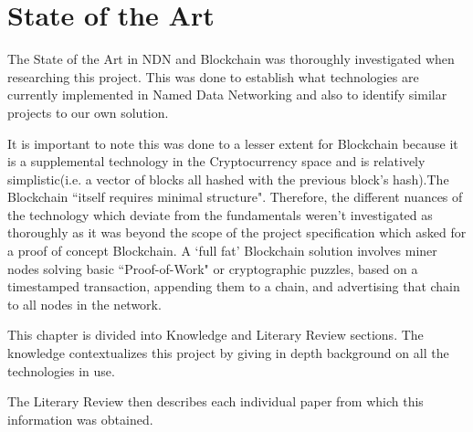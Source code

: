 \chapter{State of the Art}
The State of the Art in NDN and Blockchain was thoroughly investigated when researching this project. This was done to establish what technologies are currently implemented in Named Data Networking and also to identify similar projects to our own solution.\par It is important to note this was done to a lesser extent for Blockchain because it is a supplemental technology in the Cryptocurrency space and is relatively simplistic(i.e. a vector of blocks all hashed with the previous block's hash).The Blockchain ``itself requires minimal structure"\cite{08}. Therefore, the different nuances of the technology which deviate from the fundamentals weren't investigated as thoroughly as it was beyond the scope of the project specification which asked for a proof of concept Blockchain. A `full fat' Blockchain solution involves miner nodes solving basic ``Proof-of-Work" or cryptographic puzzles\cite{09}, based on a timestamped transaction, appending them to a chain, and advertising that chain to all nodes in the network. 

This chapter is divided into Knowledge and Literary Review sections. The knowledge contextualizes this project by giving in depth background on all the technologies in use. 

The Literary Review then describes each individual paper from which this information was obtained. 

